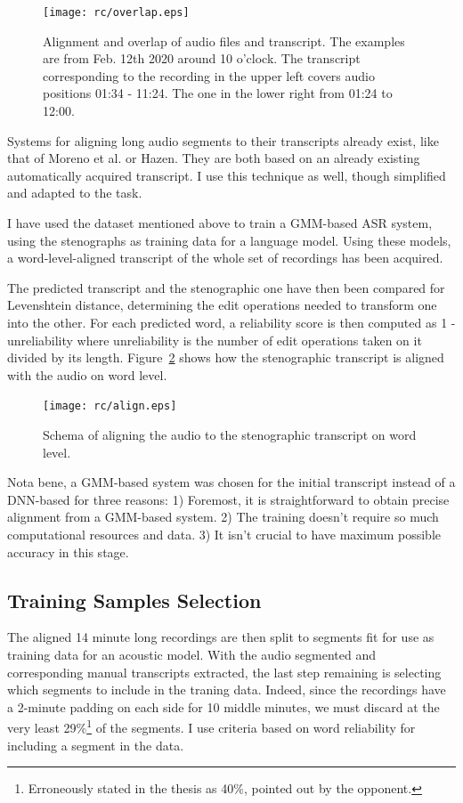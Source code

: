 \documentclass[12pt,a4paper]{report}
\begin{document}
\begin{figure}[tpb]
\centering
\texttt{[image: rc/overlap.eps]}
\caption{Alignment and overlap of audio files and transcript. The examples are
from Feb. 12th 2020 around 10 o'clock. The transcript corresponding to the
recording in the upper left covers audio positions 01:34 - 11:24. The one in the
lower right from 01:24 to 12:00.}
\label{fig:overlap}
\end{figure}

Systems for aligning long audio segments to their transcripts already exist,
like that of Moreno et al.\cite{moreno1998recursive} or
Hazen\cite{hazen2006automatic}. They are both based on an already existing
automatically acquired transcript. I use this technique as well, though 
simplified and adapted to the task.

I have used the dataset mentioned above\cite{pspdata} to train a GMM-based ASR
system, using the stenographs as training data for a language model. Using these
models, a word-level-aligned transcript of the whole set of recordings has been
acquired.

The predicted transcript and the stenographic one have then been compared for
Levenshtein distance, determining the edit operations needed to transform one
into the other. For each predicted word, a reliability score is then
computed as 1 - unreliability where unreliability is the number of edit
operations taken on it divided by its length.
Figure~\ref{fig:align} shows how the stenographic transcript is aligned with the
audio on word level.

\begin{figure}[htpb]
\texttt{[image: rc/align.eps]}
\caption{Schema of aligning the audio to the stenographic transcript on word
level.}
\label{fig:align}
\end{figure}

Nota bene, a GMM-based system was chosen for the initial transcript instead of
a DNN-based for three reasons: 1) Foremost, it is straightforward to obtain
precise alignment from a GMM-based system. 2) The training doesn't require so
much computational resources and data. 3) It isn't crucial to have maximum possible
accuracy in this stage.

\subsection{Training Samples Selection}

The aligned 14 minute long recordings are then split to segments fit for use as
training data for an acoustic model.
With the audio segmented and corresponding manual transcripts extracted, the
last step remaining is selecting which segments to include in the traning data.
Indeed, since the recordings have a 2-minute padding on each side for 10 middle
minutes, we must discard at the very least 29\%\footnote{Erroneously stated in
the thesis as 40\%, pointed out by the opponent.} of the segments. I use
criteria based on word reliability for including a segment in the data.
\end{document}
